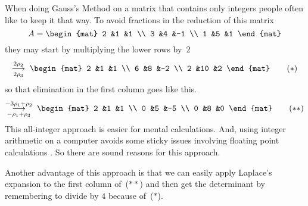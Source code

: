 
When doing Gauss's Method on a matrix that contains only integers
people often like to keep it that way.
To avoid fractions in the reduction of this matrix
\begin{equation*}
  A=
  \begin{mat}
    2 &1 &1 \\
    3 &4 &-1 \\
    1 &5 &1 
  \end{mat}
\end{equation*}
they may start by multiplying the lower rows
by~$2$
\begin{equation*}
  \grstep[2\rho_3]{2\rho_2}\;
  \begin{mat}
    2 &1 &1 \\
    6 &8 &-2 \\
    2 &10 &2 
  \end{mat}
  \tag{$*$}
\end{equation*}
so that elimination in the first column goes like this.
\begin{equation*}
  \grstep[-\rho_1+\rho_3]{-3\rho_1+\rho_2}\;
  \begin{mat}
    2 &1 &1 \\
    0 &5 &-5 \\
    0 &8 &0 
  \end{mat}
  \tag{$**$}
\end{equation*}
This all-integer approach is easier for mental calculations. 
And, using integer arithmetic on a computer
avoids some sticky issues involving floating point calculations \cite{Kahan}.
So there are sound reasons for this approach.

Another advantage of this approach is that
we can easily apply Laplace's expansion to the 
first column of~($**$) and then get the determinant by 
remembering to divide by $4$ because of~($*$).

